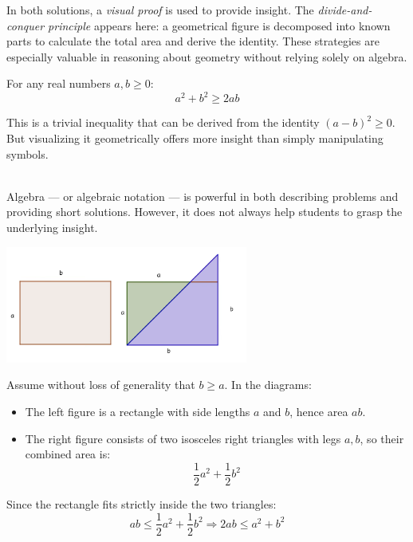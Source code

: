 \documentclass{article}
\begin{document}
\begin{remark*}
    In both solutions, a \emph{visual proof} is used to provide insight. The \emph{divide-and-conquer principle} appears here: a geometrical figure is decomposed into known parts to calculate the total area and derive the identity. These strategies are especially valuable in reasoning about geometry without relying solely on algebra.
\end{remark*}


\begin{example}\label{example:inequality-area}
    For any real numbers \( a, b \geq 0 \):
    \[
        a^2 + b^2 \geq 2ab
    \]
      
\end{example}

\begin{analysis*}
    This is a trivial inequality that can be derived from the identity \( (a - b)^2 \geq 0 \).  
    But visualizing it geometrically offers more insight than simply manipulating symbols.
\end{analysis*}

\begin{soln}\ \\\indent
    Algebra — or algebraic notation — is powerful in both describing problems and providing short solutions.  
    However, it does not always help students to grasp the underlying insight.
    \begin{center}
        \includegraphics[width=8cm]{./png/simple-inequality.png}
    \end{center}

    Assume without loss of generality that \( b \geq a \). In the diagrams:
    \begin{itemize}[topsep=0pt, itemsep=2pt]
        \item The left figure is a rectangle with side lengths \( a \) and \( b \), hence area \( ab \).
        \item The right figure consists of two isosceles right triangles with legs \( a, b \), so their combined area is:
        \[
            \frac{1}{2}a^2 + \frac{1}{2}b^2
        \]
    \end{itemize}

    Since the rectangle fits strictly inside the two triangles:
    \[
        ab \leq \frac{1}{2}a^2 + \frac{1}{2}b^2 \Rightarrow 2ab \leq a^2 + b^2
    \]
\end{soln}
\end{document}
